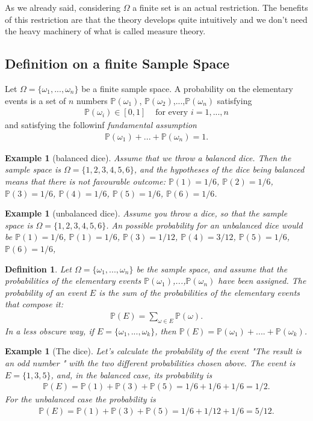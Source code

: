 \documentclass[12pt]{article}
\newtheorem{definition}[theorem]{Definition}
\newtheorem{example}[theorem]{Example}
\newcommand{\<}{{\langle \!\! \langle}}
\renewcommand{\>}{{\rangle \!\! \rangle}}
\newcommand{\bel}[2]{\begin{equation} \label{#1} \begin{split} #2
 					\end{split} \end{equation}}
\newcommand{\commento}[1]{
	\par\noindent
	\colorbox{light}{\begin{minipage}{120 mm}#1\end{minipage}}
	\par\noindent
}
\begin{document}
 \commento{As we already said, considering $\Omega$ a finite set is an actual restriction. The benefits of this restriction are that the theory develops quite intuitively and we don't need the heavy machinery of what is called measure theory.}


\subsection{Definition on a finite Sample Space}

Let $\Omega=\{\omega_1,...,\omega_n\}$ be a finite sample space. A probability on the elementary events
is a set of $n$ numbers $\mathbb{P}(\omega_1)$, $\mathbb{P}(\omega_2)$,...,$\mathbb{P}(\omega_n)$ satisfying 
\bel{e:pos}{\mathbb{P}(\omega_i)\in[0,1] & \textrm{ for every } i=1,...,n} 
and satisfying the followinf \emph{ fundamental assumption }
\bel{e:fun}{\mathbb{P}(\omega_1)+...+\mathbb{P}(\omega_n)=1.}

\begin{example}[balanced dice]
	Assume that we throw a balanced dice. Then the sample space is $\Omega=\{1,2,3,4,5,6\}$, and the hypotheses of the dice being balanced means that there is not favourable outcome:  $ \mathbb{P}(1)=1/6$, $ \mathbb{P}(2)=1/6$, $ \mathbb{P}(3)=1/6$, $ \mathbb{P}(4)=1/6$, $ \mathbb{P}(5)=1/6$, $ \mathbb{P}(6)=1/6$.
\end{example}
\begin{example}[unbalanced dice]
	Assume you throw a dice, so that the sample space is $\Omega=\{1,2,3,4,5,6\}$. An possible probability for an unbalanced dice would be $ \mathbb{P}(1)=1/6$,  $ \mathbb{P}(1)=1/6$, $ \mathbb{P}(3)=1/12$, $ \mathbb{P}(4)=3/12$, $ \mathbb{P}(5)=1/6$, $ \mathbb{P}(6)=1/6$,
\end{example}


\begin{definition}
	Let $\Omega =\{\omega_1,...,\omega_n\}$ be the sample space, and assume that the probabilities of the elementary events $\mathbb{P}(\omega_1)$,...,$\mathbb{P}(\omega_n)$ have been assigned. The probability of an event $E$ is the sum of the probabilities of the elementary events that compose it:
	\bel{d:prob}{\mathbb{P}(E)=\sum_{\omega\in E}\mathbb{P}(\omega).}
In a less obscure way, if $E=\{\omega_1,...,\omega_k\}$, then $\mathbb{P}(E)=\mathbb{P}(\omega_1)+....+\mathbb{P}(\omega_k)$. 
\end{definition}

	\begin{example}[The dice]
		Let's calculate the probability of the event "The result is an odd number " with the two different probabilities chosen above. The event is $ E=\{1,3,5\}$, and, in the balanced case, its probability is 
		\bel{}{\mathbb{P}(E)=\mathbb{P}(1)+\mathbb{P}(3)+\mathbb{P}(5)=1/6+1/6+1/6=1/2.}
		For the unbalanced case the probability is	
		\bel{}{\mathbb{P}(E)=\mathbb{P}(1)+\mathbb{P}(3)+\mathbb{P}(5)=1/6+1/12+1/6=5/12.}
		
	\end{example}
\end{document}
